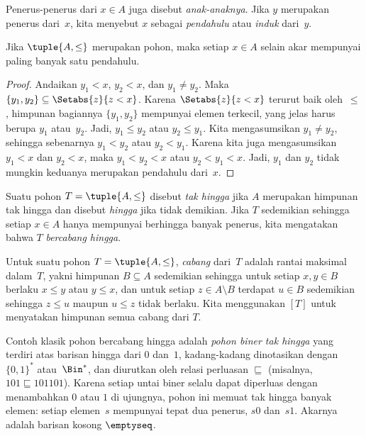 \documentclass[../../../include/open-logic-section]{subfiles}
\begin{document}
Penerus-penerus dari $x \in A$ juga disebut \emph{anak-anaknya}. Jika
$y$ merupakan penerus dari~$x$, kita menyebut $x$ sebagai \emph{pendahulu}
atau \emph{induk} dari~$y$.

\begin{prop}
Jika $\tuple{A,\le}$ merupakan pohon, maka setiap $x \in A$ selain akar
mempunyai paling banyak satu pendahulu.
\end{prop}

\begin{proof}
  Andaikan $y_1 < x$, $y_2 < x$, dan $y_1 \neq y_2$. Maka
  $\{y_1, y_2\} \subseteq \Setabs{z}{z<x}$. Karena $\Setabs{z}{z<x}$ terurut
  baik oleh~$\le$, himpunan bagiannya $\{y_1, y_2\}$ mempunyai elemen
  terkecil, yang jelas harus berupa $y_1$ atau~$y_2$. Jadi, $y_1 \le y_2$
  atau $y_2 \le y_1$. Kita mengasumsikan $y_1 \neq y_2$, sehingga sebenarnya
  $y_1 < y_2$ atau $y_2 < y_1$. Karena kita juga mengasumsikan $y_1 < x$ dan
  $y_2 < x$, maka $y_1 < y_2 < x$ atau $y_2 < y_1 < x$. Jadi, $y_1$ dan $y_2$
  tidak mungkin keduanya merupakan pendahulu dari~$x$.
\end{proof}

\begin{defn}
Suatu pohon $T = \tuple{A, \le}$ disebut \emph{tak hingga} jika $A$ merupakan
himpunan tak hingga dan disebut \emph{hingga} jika tidak demikian. Jika $T$
sedemikian sehingga setiap $x \in A$ hanya mempunyai berhingga banyak
penerus, kita mengatakan bahwa $T$ \emph{bercabang hingga}.
\end{defn}

\begin{defn}[Cabang]
Untuk suatu pohon $T = \tuple{A, \le}$, \emph{cabang} dari~$T$ adalah rantai
maksimal dalam~$T$, yakni himpunan $B \subseteq A$ sedemikian sehingga untuk
setiap $x, y \in B$ berlaku $x \le y$ atau $y \le x$, dan untuk setiap
$z \in A \setminus B$ terdapat $u \in B$ sedemikian sehingga $z \le u$ maupun
$u \le z$ tidak berlaku.
%
Kita menggunakan $[T]$ untuk menyatakan himpunan semua cabang dari $T$.
\end{defn}

\begin{ex}
Contoh klasik pohon bercabang hingga adalah \emph{pohon biner tak hingga}
yang terdiri atas barisan hingga dari $0$ dan~$1$, kadang-kadang dinotasikan
dengan $\{0,1\}^*$ atau~$\Bin^*$, dan diurutkan oleh relasi perluasan
$\sqsubseteq$ (misalnya, $101 \sqsubseteq 101101$). Karena setiap untai biner
selalu dapat diperluas dengan menambahkan $0$ atau $1$ di ujungnya, pohon ini
memuat tak hingga banyak elemen: setiap elemen~$s$ mempunyai tepat dua
penerus, $s0$ dan~$s1$. Akarnya adalah barisan kosong $\emptyseq$.
\end{ex}
\end{document}
